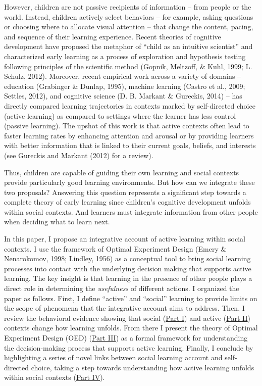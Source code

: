 \documentclass[english,floatsintext,man]{apa6}
\theoremstyle{definition}
\theoremstyle{definition}
\theoremstyle{definition}
\theoremstyle{remark}
\begin{document}
However, children are not passive recipients of information -- from
people or the world. Instead, children actively select behaviors -- for
example, asking questions or choosing where to allocate visual attention
-- that change the content, pacing, and sequence of their learning
experience. Recent theories of cognitive development have proposed the
metaphor of \enquote{child as an intuitive scientist} and characterized
early learning as a process of exploration and hypothesis testing
following principles of the scientific method (Gopnik, Meltzoff, \&
Kuhl, 1999; L. Schulz, 2012). Moreover, recent empirical work across a
variety of domains -- education (Grabinger \& Dunlap, 1995), machine
learning (Castro et al., 2009; Settles, 2012), and cognitive science (D.
B. Markant \& Gureckis, 2014) -- has directly compared learning
trajectories in contexts marked by self-directed choice (active
learning) as compared to settings where the learner has less control
(passive learning). The upshot of this work is that active contexts
often lead to faster learning rates by enhancing attention and arousal
or by providing learners with better information that is linked to their
current goals, beliefs, and interests (see Gureckis and Markant (2012)
for a review).

Thus, children are capable of guiding their own learning and social
contexts provide particularly good learning environments. But how can we
integrate these two proposals? Answering this question represents a
significant step towards a complete theory of early learning since
children's cognitive development unfolds within social contexts. And
learners must integrate information from other people when deciding what
to learn next.

In this paper, I propose an integrative account of active learning
within social contexts. I use the framework of Optimal Experiment Design
(Emery \& Nenarokomov, 1998; Lindley, 1956) as a conceptual tool to
bring social learning processes into contact with the underlying
decision making that supports active learning. The key insight is that
learning in the presence of other people plays a direct role in
determining the \emph{usefulness} of different actions. I organized the
paper as follows. First, I define \enquote{active} and \enquote{social}
learning to provide limits on the scope of phenomena that the
integrative account aims to address. Then, I review the behavioral
evidence showing that social (\protect\hyperlink{p1}{Part I}) and active
(\protect\hyperlink{p2}{Part II}) contexts change how learning unfolds.
From there I present the theory of Optimal Experiment Design (OED)
(\protect\hyperlink{p3}{Part III}) as a formal framework for
understanding the decision-making process that supports active learning.
Finally, I conclude by highlighting a series of novel links between
social learning account and self-directed choice, taking a step towards
understanding how active learning unfolds within social contexts
(\protect\hyperlink{p4}{Part IV}).
\end{document}
